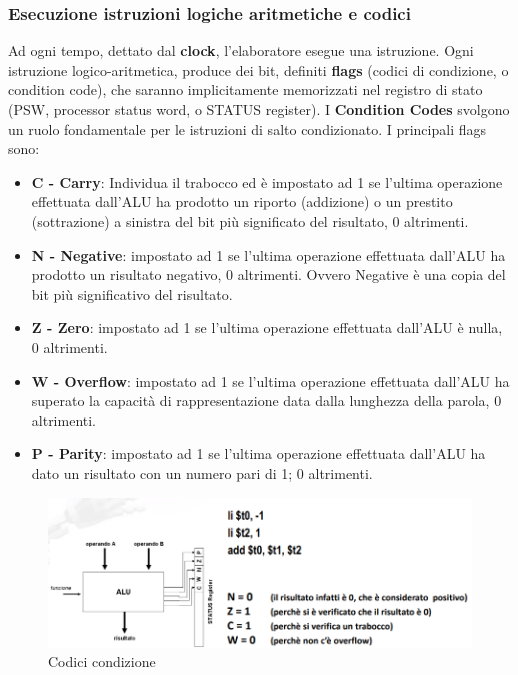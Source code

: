 \documentclass[12pt]{article} %
\begin{document}
\subsubsection{Esecuzione istruzioni logiche aritmetiche e codici}
Ad ogni tempo, dettato dal \textbf{clock}, l’elaboratore esegue una istruzione. Ogni istruzione logico-aritmetica, produce dei bit, definiti \textbf{flags} (codici di condizione, o condition code), che saranno implicitamente memorizzati nel registro di stato (PSW, processor status word, o STATUS register).
I \textbf{Condition Codes} svolgono un ruolo fondamentale per le istruzioni di salto condizionato.
\newpage
I principali flags sono:
\begin{itemize}
    \item \textbf{C - Carry}: Individua il trabocco ed è impostato ad 1 se l’ultima operazione effettuata dall’ALU ha prodotto un riporto (addizione) o un prestito (sottrazione) a sinistra del bit più significato del risultato, 0 altrimenti.
    \item \textbf{N - Negative}: impostato ad 1 se l’ultima operazione effettuata dall’ALU ha prodotto un risultato negativo, 0 altrimenti. Ovvero Negative è una copia del bit più significativo del risultato.
    \item \textbf{Z - Zero}: impostato ad 1 se l’ultima operazione effettuata dall’ALU è nulla, 0 altrimenti.
    \item \textbf{W - Overflow}: impostato ad 1 se l’ultima operazione effettuata dall’ALU ha superato la capacità di rappresentazione data dalla lunghezza della parola, 0 altrimenti.
    \item \textbf{P - Parity}: impostato ad 1 se l’ultima operazione effettuata dall’ALU ha dato un risultato con un numero pari di 1; 0 altrimenti.
\end{itemize}
\begin{figure}[h]
    \centering
    \includegraphics[width=1\linewidth]{flas.png}
    \caption{Codici condizione}
    \label{fig:enter-label}
\end{figure}
\newpage
\end{document}

